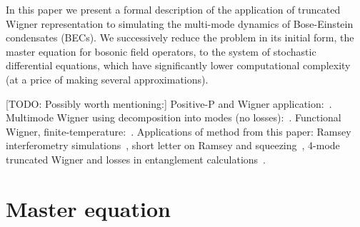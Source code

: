 \documentclass[12pt,aip,jmp,amssymb,amsmath]{revtex4-1}
\begin{document}
In this paper we present a formal description of the application of truncated Wigner representation to simulating the multi-mode dynamics of Bose-Einstein condensates (BECs).
We successively reduce the problem in its initial form, the master equation for bosonic field operators, to the system of stochastic differential equations, which have significantly lower computational complexity (at a price of making several approximations).

[TODO: Possibly worth mentioning:]
Positive-P and Wigner application:~\cite{Deuar2007}.
Multimode Wigner using decomposition into modes (no losses):~\cite{Norrie2005,Norrie2006}.
Functional Wigner, finite-temperature:~\cite{Steel1998,Isella2006}.
Applications of method from this paper: Ramsey interferometry simulations~\cite{Egorov2011}, short letter on Ramsey and squeezing~\cite{Opanchuk2012}, 4-mode truncated Wigner and losses in entanglement calculations~\cite{Opanchuk2012a}.


\section{Master equation}
\end{document}
